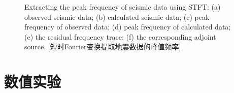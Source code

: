 \begin{figure}[!htbp]
	{Extracting the peak frequency of seismic data using STFT: (a) observed seismic data; 
	(b) calculated seismic data; (c) peak frequency of observed data; (d) peak frequency of 
	calculated data; (e) the residual frequency trace; (f) the corresponding adjoint source.}
    [短时Fourier变换提取地震数据的峰值频率]
    \label{fig:peak_frequency}
\end{figure}

\newpage
\vspace{0.5cm}
\section{数值实验}

